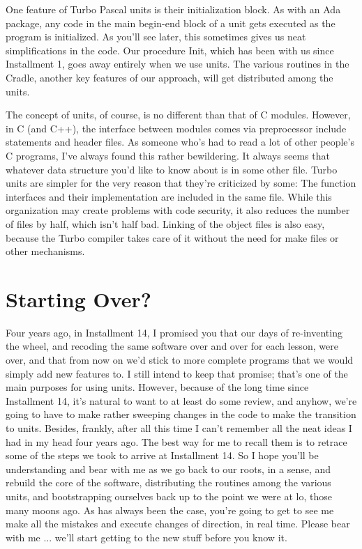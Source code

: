 \documentclass[float=false, crop=false]{standalone}
\begin{document}
One feature of Turbo Pascal units is their initialization block. As with an Ada
package, any code in the main begin-end block of a unit gets executed as the
program is initialized. As you'll see later, this sometimes gives us neat
simplifications in the code. Our procedure Init, which has been with us since
Installment 1, goes away entirely when we use units. The various routines in the
Cradle, another key features of our approach, will get distributed among the
units.

The concept of units, of course, is no different than that of C modules.
However, in C (and C++), the interface between modules comes via preprocessor
include statements and header files. As someone who's had to read a lot of other
people's C programs, I've always found this rather bewildering. It always seems
that whatever data structure you'd like to know about is in some other file.
Turbo units are simpler for the very reason that they're criticized by some: The
function interfaces and their implementation are included in the same file.
While this organization may create problems with code security, it also reduces
the number of files by half, which isn't half bad. Linking of the object files
is also easy, because the Turbo compiler takes care of it without the need for
make files or other mechanisms.


\section{Starting Over?}

Four years ago, in Installment 14, I promised you that our days of re-inventing
the wheel, and recoding the same software over and over for each lesson, were
over, and that from now on we'd stick to more complete programs that we would
simply add new features to. I still intend to keep that promise; that's one of
the main purposes for using units. However, because of the long time since
Installment 14, it's natural to want to at least do some review, and anyhow,
we're going to have to make rather sweeping changes in the code to make the
transition to units. Besides, frankly, after all this time I can't remember all
the neat ideas I had in my head four years ago. The best way for me to recall
them is to retrace some of the steps we took to arrive at Installment 14. So I
hope you'll be understanding and bear with me as we go back to our roots, in a
sense, and rebuild the core of the software, distributing the routines among the
various units, and bootstrapping ourselves back up to the point we were at lo,
those many moons ago. As has always been the case, you're going to get to see me
make all the mistakes and execute changes of direction, in real time. Please
bear with me ... we'll start getting to the new stuff before you know it.
\end{document}
